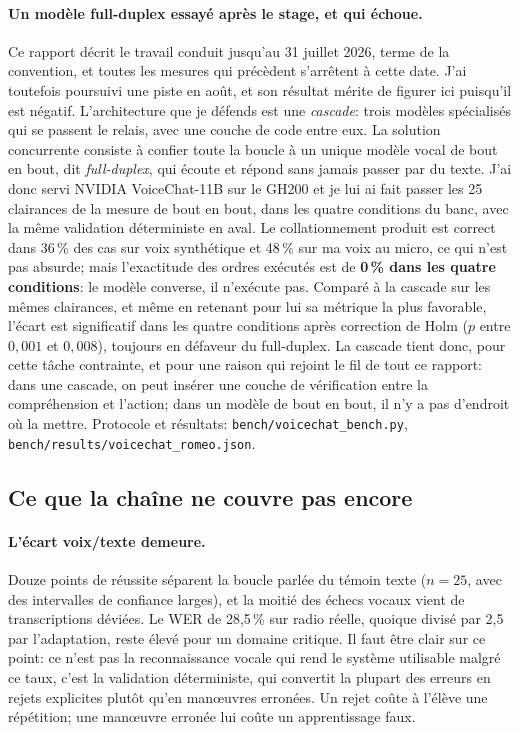 \documentclass[11pt,a4paper]{article}
\begin{document}
\paragraph{Un modèle full-duplex essayé après le stage, et qui échoue.} Ce rapport décrit le travail conduit jusqu'au 31 juillet 2026, terme de la convention, et toutes les mesures qui précèdent s'arrêtent à cette date. J'ai toutefois poursuivi une piste en août, et son résultat mérite de figurer ici puisqu'il est négatif. L'architecture que je défends est une \emph{cascade}: trois modèles spécialisés qui se passent le relais, avec une couche de code entre eux. La solution concurrente consiste à confier toute la boucle à un unique modèle vocal de bout en bout, dit \emph{full-duplex}, qui écoute et répond sans jamais passer par du texte. J'ai donc servi NVIDIA VoiceChat-11B sur le GH200 et je lui ai fait passer les 25 clairances de la mesure de bout en bout, dans les quatre conditions du banc, avec la même validation déterministe en aval. Le collationnement produit est correct dans 36\,\% des cas sur voix synthétique et 48\,\% sur ma voix au micro, ce qui n'est pas absurde; mais l'exactitude des ordres exécutés est de \textbf{0\,\% dans les quatre conditions}: le modèle converse, il n'exécute pas. Comparé à la cascade sur les mêmes clairances, et même en retenant pour lui sa métrique la plus favorable, l'écart est significatif dans les quatre conditions après correction de Holm ($p$ entre $0{,}001$ et $0{,}008$), toujours en défaveur du full-duplex. La cascade tient donc, pour cette tâche contrainte, et pour une raison qui rejoint le fil de tout ce rapport: dans une cascade, on peut insérer une couche de vérification entre la compréhension et l'action; dans un modèle de bout en bout, il n'y a pas d'endroit où la mettre. Protocole et résultats: \texttt{bench/voicechat\_bench.py}, \texttt{bench/results/voicechat\_romeo.json}.

\subsection{Ce que la chaîne ne couvre pas encore}

\paragraph{L'écart voix/texte demeure.} Douze points de réussite séparent la boucle parlée du témoin texte ($n = 25$, avec des intervalles de confiance larges), et la moitié des échecs vocaux vient de transcriptions déviées. Le WER de 28,5\,\% sur radio réelle, quoique divisé par 2,5 par l'adaptation, reste élevé pour un domaine critique. Il faut être clair sur ce point: ce n'est pas la reconnaissance vocale qui rend le système utilisable malgré ce taux, c'est la validation déterministe, qui convertit la plupart des erreurs en rejets explicites plutôt qu'en man\oe uvres erronées. Un rejet coûte à l'élève une répétition; une man\oe uvre erronée lui coûte un apprentissage faux.
\end{document}
